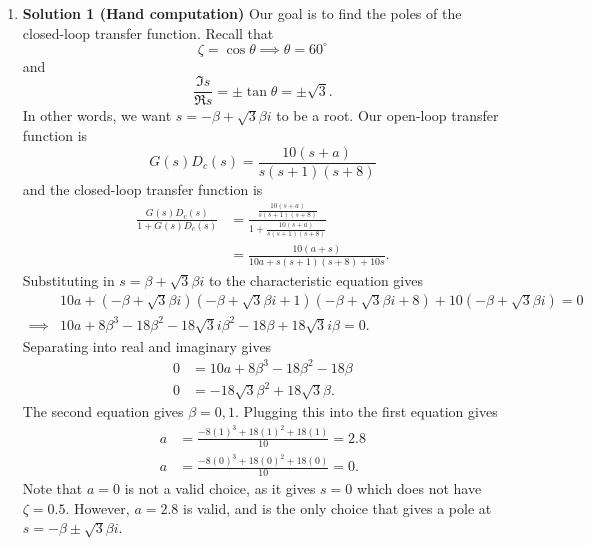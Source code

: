 \documentclass{article}
\begin{document}
\begin{enumerate}[label=\textbf{3.\arabic*}]
\item \textbf{Solution 1 (Hand computation)} Our goal is to find the poles of the closed-loop transfer function. Recall that 
\begin{equation}
    \zeta = \cos\theta \implies \theta = 60^\circ
\end{equation}
and 
\begin{equation}
    \frac{\Im s}{\Re s} = \pm \tan \theta = \pm \sqrt{3}.
\end{equation}
In other words, we want $s = -\beta + \sqrt{3}\beta i$ to be a root. Our open-loop transfer function is
\begin{equation}
    G(s)D_c(s) = \frac{10(s+a)}{s(s+1)(s+8)}
\end{equation}
and the closed-loop transfer function is
\begin{align}
    \frac{G(s)D_c(s)}{1+G(s)D_c(s)} &= \frac{\frac{10(s+a)}{s(s+1)(s+8)}}{1+\frac{10(s+a)}{s(s+1)(s+8)}} \\ 
    & = \frac{10 (a + s)}{10 a + s (s + 1) (s + 8) + 10 s}.
\end{align}
Substituting in $s=\beta+\sqrt{3}\beta i$ to the characteristic equation gives
\begin{align}
   & 10 a + (-\beta+\sqrt{3}\beta i) (-\beta+\sqrt{3}\beta i + 1) (-\beta+\sqrt{3}\beta i + 8) + 10 (-\beta+\sqrt{3}\beta i) = 0 \\
  \implies &10 a + 8 \beta^{3} - 18 \beta^{2} - 18 \sqrt{3} i \beta^{2} - 18 \beta + 18 \sqrt{3} i \beta = 0.
\end{align}
Separating into real and imaginary gives 
\begin{align}
    0 &=10a + 8\beta^3 - 18\beta^2 - 18\beta \\ 
    0 &= -18\sqrt{3} \beta^2 + 18\sqrt{3} \beta.
\end{align}
The second equation gives $\beta = 0,1.$ Plugging this into the first equation gives 
\begin{align}
    a &= \frac{-8(1)^3+18(1)^2+18(1)}{10} = 2.8 \\ 
    a &= \frac{-8(0)^3+18(0)^2+18(0)}{10} = 0.
\end{align}
Note that $a=0$ is not a valid choice, as it gives $s=0$ which does not have $\zeta=0.5.$ However, $\boxed{a=2.8}$ is valid, and is the only choice that gives a pole at $s=-\beta \pm \sqrt{3}\beta i.$


\end{enumerate}
\end{document}
